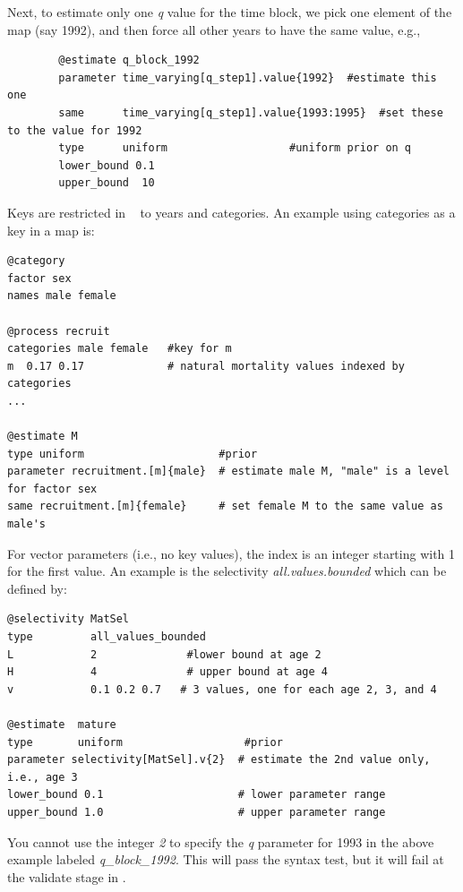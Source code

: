 Next, to estimate only one \textit{q} value for the time block, we pick one element of the map (say 1992), and then force all other years to have the same value, e.g.,  

{\small{\begin{verbatim}
		@estimate q_block_1992
		parameter time_varying[q_step1].value{1992}  #estimate this one
		same      time_varying[q_step1].value{1993:1995}  #set these to the value for 1992
		type      uniform                   #uniform prior on q
		lower_bound 0.1 
		upper_bound  10  
		\end{verbatim}}}

Keys are restricted in \CNAME~ to years and categories. An example using categories as a key in a map is:
{\small{\begin{verbatim}
@category
factor sex
names male female

@process recruit
categories male female   #key for m
m  0.17 0.17             # natural mortality values indexed by categories
...

@estimate M
type uniform                     #prior
parameter recruitment.[m]{male}  # estimate male M, "male" is a level for factor sex
same recruitment.[m]{female}     # set female M to the same value as male's
	\end{verbatim}}}
	
For vector parameters (i.e., no key values), the index is an integer starting with 1 for the first value. An example is the selectivity \textit{all.values.bounded} which can be defined by:

{\small{\begin{verbatim}
@selectivity MatSel
type         all_values_bounded
L            2              #lower bound at age 2
H            4              # upper bound at age 4
v            0.1 0.2 0.7   # 3 values, one for each age 2, 3, and 4

@estimate  mature
type       uniform                   #prior
parameter selectivity[MatSel].v{2}  # estimate the 2nd value only, i.e., age 3
lower_bound 0.1                     # lower parameter range
upper_bound 1.0                     # upper parameter range
	\end{verbatim}}}
	
You cannot use the integer \textit{{2}} to specify the \textit{q} parameter for 1993 in the above example labeled \textit{q\_block\_1992}. This will pass the syntax test, but it will fail at the validate stage in \CNAME.




